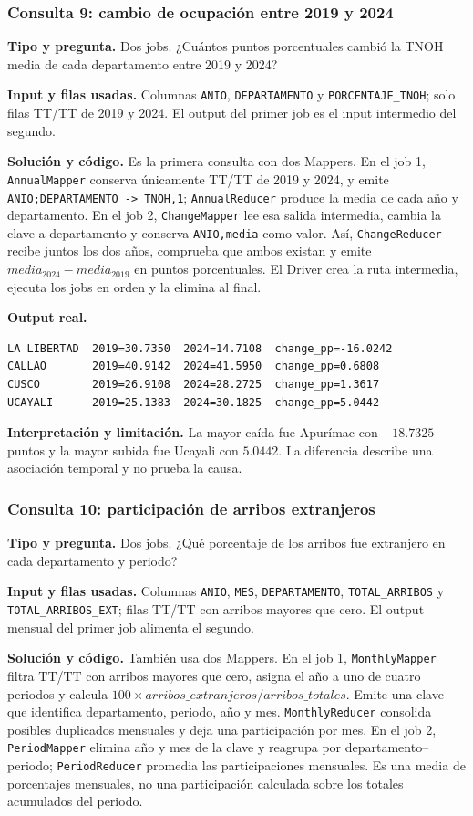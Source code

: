 \documentclass[10pt,a4paper]{article}
\theoremstyle{definition}
\begin{document}
\subsubsection{Consulta 9: cambio de ocupación entre 2019 y 2024}
\textbf{Tipo y pregunta.} Dos jobs. ¿Cuántos puntos porcentuales cambió la TNOH
media de cada departamento entre 2019 y 2024?

\textbf{Input y filas usadas.} Columnas \texttt{ANIO}, \texttt{DEPARTAMENTO} y
\texttt{PORCENTAJE\_TNOH}; solo filas TT/TT de 2019 y 2024. El output del primer
job es el input intermedio del segundo.

\textbf{Solución y código.} Es la primera consulta con dos Mappers. En el job 1,
\texttt{AnnualMapper} conserva únicamente TT/TT de 2019 y 2024, y emite
\texttt{ANIO;DEPARTAMENTO -> TNOH,1}; \texttt{AnnualReducer} produce la media de
cada año y departamento. En el job 2, \texttt{ChangeMapper} lee esa salida
intermedia, cambia la clave a departamento y conserva \texttt{ANIO,media} como
valor. Así, \texttt{ChangeReducer} recibe juntos los dos años, comprueba que
ambos existan y emite $media_{2024}-media_{2019}$ en puntos porcentuales. El
Driver crea la ruta intermedia, ejecuta los jobs en orden y la elimina al final.

\textbf{Output real.}
\begin{lstlisting}[style=resultado]
LA LIBERTAD  2019=30.7350  2024=14.7108  change_pp=-16.0242
CALLAO       2019=40.9142  2024=41.5950  change_pp=0.6808
CUSCO        2019=26.9108  2024=28.2725  change_pp=1.3617
UCAYALI      2019=25.1383  2024=30.1825  change_pp=5.0442
\end{lstlisting}
\textbf{Interpretación y limitación.} La mayor caída fue Apurímac con
$-18.7325$ puntos y la mayor subida fue Ucayali con $5.0442$. La diferencia
describe una asociación temporal y no prueba la causa.

\subsubsection{Consulta 10: participación de arribos extranjeros}
\textbf{Tipo y pregunta.} Dos jobs. ¿Qué porcentaje de los arribos fue
extranjero en cada departamento y periodo?

\textbf{Input y filas usadas.} Columnas \texttt{ANIO}, \texttt{MES},
\texttt{DEPARTAMENTO}, \texttt{TOTAL\_ARRIBOS} y
\texttt{TOTAL\_ARRIBOS\_EXT}; filas TT/TT con arribos mayores que cero. El
output mensual del primer job alimenta el segundo.

\textbf{Solución y código.} También usa dos Mappers. En el job 1,
\texttt{MonthlyMapper} filtra TT/TT con arribos mayores que cero, asigna el año
a uno de cuatro periodos y calcula
$100\times arribos\_extranjeros/arribos\_totales$. Emite una clave que identifica
departamento, periodo, año y mes. \texttt{MonthlyReducer} consolida posibles
duplicados mensuales y deja una participación por mes. En el job 2,
\texttt{PeriodMapper} elimina año y mes de la clave y reagrupa por
departamento--periodo; \texttt{PeriodReducer} promedia las participaciones
mensuales. Es una media de porcentajes mensuales, no una participación calculada
sobre los totales acumulados del periodo.
\end{document}
